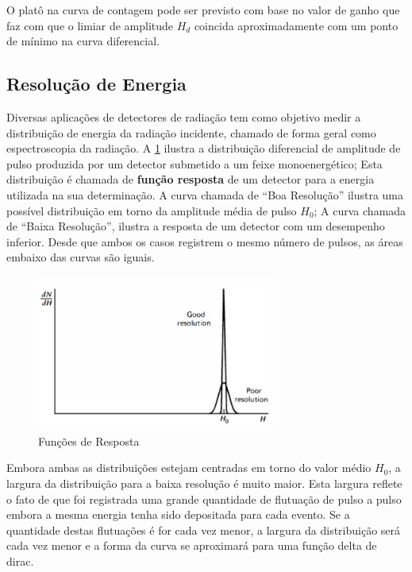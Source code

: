 \documentclass[11pt,a4paper]{article}
\begin{document}
		O platô na curva de contagem pode ser previsto com base no valor de ganho que faz com que o limiar de amplitude $H_d$ coincida aproximadamente com um ponto de mínimo na curva diferencial. 


	\subsection{Resolução de Energia}

		Diversas aplicações de detectores de radiação tem como objetivo medir a distribuição de energia da radiação incidente, chamado de forma geral como espectroscopia da radiação. A  \ref{fig:funcoesDeResposta} ilustra a distribuição diferencial de amplitude de pulso produzida por um detector submetido a um feixe monoenergético; Esta distribuição é chamada de \textbf{função resposta} de um detector para a energia utilizada na sua determinação. A curva chamada de ``Boa Resolução'' ilustra uma possível distribuição em torno da amplitude média de pulso $H_0$; A curva chamada de ``Baixa Resolução'', ilustra a resposta de um detector com um desempenho inferior. Desde que ambos os casos registrem o mesmo número de pulsos, as áreas embaixo das curvas são iguais.

		\begin{figure}[h]
			\centering
			\includegraphics[width=0.7\textwidth]{Imagens/funcoesDeResposta.jpg}
			\caption{Funções de Resposta}
			\label{fig:funcoesDeResposta}
		\end{figure}

		Embora ambas as distribuições estejam centradas em torno do valor médio $H_0$, a largura da distribuição para a baixa resolução é muito maior. Esta largura reflete o fato de que foi registrada uma grande quantidade de flutuação de pulso a pulso embora a mesma energia tenha sido depositada para cada evento. Se a quantidade destas flutuações é for cada vez menor, a largura da distribuição será cada vez menor e a forma da curva se aproximará para uma função delta de dirac. 
\end{document}
